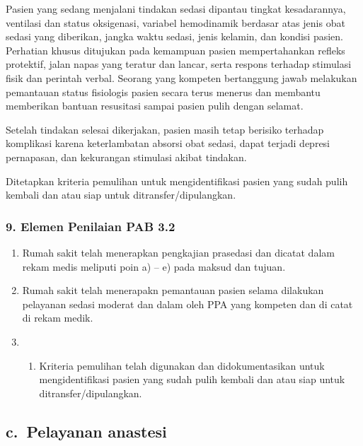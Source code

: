 \documentclass[
]{book}
\providecommand{\tightlist}{%
  \setlength{\itemsep}{0pt}\setlength{\parskip}{0pt}}
\begin{document}
Pasien yang sedang menjalani tindakan sedasi dipantau tingkat kesadarannya, ventilasi dan status oksigenasi, variabel hemodinamik berdasar atas jenis obat sedasi yang diberikan, jangka waktu sedasi, jenis kelamin, dan kondisi pasien. Perhatian khusus ditujukan pada kemampuan pasien mempertahankan refleks protektif, jalan napas yang teratur dan lancar, serta respons terhadap stimulasi fisik dan perintah verbal. Seorang yang kompeten bertanggung jawab melakukan pemantauan status fisiologis pasien secara terus menerus dan membantu memberikan bantuan resusitasi sampai pasien pulih dengan selamat.

Setelah tindakan selesai dikerjakan, pasien masih tetap berisiko terhadap komplikasi karena keterlambatan absorsi obat sedasi, dapat terjadi depresi pernapasan, dan kekurangan stimulasi akibat tindakan.

Ditetapkan kriteria pemulihan untuk mengidentifikasi pasien yang sudah pulih kembali dan atau siap untuk ditransfer/dipulangkan.

\hypertarget{elemen-penilaian-pab-3.2}{%
\subsubsection*{9. Elemen Penilaian PAB 3.2}\label{elemen-penilaian-pab-3.2}}

\begin{enumerate}
\def\labelenumi{\alph{enumi}.}
\item
  Rumah sakit telah menerapkan pengkajian prasedasi dan dicatat dalam rekam medis meliputi poin a) -- e) pada maksud dan tujuan.
\item
  Rumah sakit telah menerapakn pemantauan pasien selama dilakukan pelayanan sedasi moderat dan dalam oleh PPA yang kompeten dan di catat di rekam medik.
\item
  \begin{enumerate}
  \def\labelenumii{\alph{enumii})}
  \setcounter{enumii}{2}
  \tightlist
  \item
    Kriteria pemulihan telah digunakan dan didokumentasikan untuk mengidentifikasi pasien yang sudah pulih kembali dan atau siap untuk ditransfer/dipulangkan.
  \end{enumerate}
\end{enumerate}

\hypertarget{c.-pelayanan-anastesi}{%
\subsection*{c.~Pelayanan anastesi}\label{c.-pelayanan-anastesi}}
\end{document}
